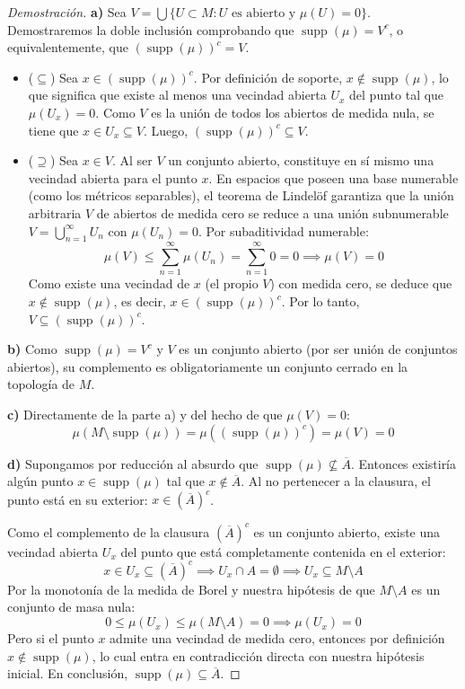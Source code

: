 \begin{proof}[Demostración]
	\textbf{a)} Sea $V = \bigcup \{ U \subset M : U \text{ es abierto y } \mu(U) = 0 \}$. Demostraremos la doble inclusión comprobando que $\operatorname{supp}(\mu) = V^c$, o equivalentemente, que $(\operatorname{supp}(\mu))^c = V$.
	\begin{itemize}
		\item ($\subseteq$) Sea $x \in (\operatorname{supp}(\mu))^c$. Por definición de soporte, $x \notin \operatorname{supp}(\mu)$, lo que significa que existe al menos una vecindad abierta $U_x$ del punto tal que $\mu(U_x) = 0$. Como $V$ es la unión de todos los abiertos de medida nula, se tiene que $x \in U_x \subseteq V$. Luego, $(\operatorname{supp}(\mu))^c \subseteq V$.
		\item ($\supseteq$) Sea $x \in V$. Al ser $V$ un conjunto abierto, constituye en sí mismo una vecindad abierta para el punto $x$. En espacios que poseen una base numerable (como los métricos separables), el teorema de Lindelöf garantiza que la unión arbitraria $V$ de abiertos de medida cero se reduce a una unión subnumerable $V = \bigcup_{n=1}^\infty U_n$ con $\mu(U_n) = 0$. Por subaditividad numerable:
		$$ \mu(V) \le \sum_{n=1}^\infty \mu(U_n) = \sum_{n=1}^\infty 0 = 0 \implies \mu(V) = 0 $$
		Como existe una vecindad de $x$ (el propio $V$) con medida cero, se deduce que $x \notin \operatorname{supp}(\mu)$, es decir, $x \in (\operatorname{supp}(\mu))^c$. Por lo tanto, $V \subseteq (\operatorname{supp}(\mu))^c$.
	\end{itemize}
	
	\textbf{b)} Como $\operatorname{supp}(\mu) = V^c$ y $V$ es un conjunto abierto (por ser unión de conjuntos abiertos), su complemento es obligatoriamente un conjunto cerrado en la topología de $M$.
	
	\textbf{c)} Directamente de la parte a) y del hecho de que $\mu(V) = 0$:
	$$ \mu(M \setminus \operatorname{supp}(\mu)) = \mu((\operatorname{supp}(\mu))^c) = \mu(V) = 0 $$
	
	\textbf{d)} Supongamos por reducción al absurdo que $\operatorname{supp}(\mu) \not\subseteq \overline{A}$. Entonces existiría algún punto $x \in \operatorname{supp}(\mu)$ tal que $x \notin \overline{A}$. Al no pertenecer a la clausura, el punto está en su exterior: $x \in (\overline{A})^c$.
	
	Como el complemento de la clausura $(\overline{A})^c$ es un conjunto abierto, existe una vecindad abierta $U_x$ del punto que está completamente contenida en el exterior:
	$$ x \in U_x \subseteq (\overline{A})^c \implies U_x \cap A = \emptyset \implies U_x \subseteq M \setminus A $$
	Por la monotonía de la medida de Borel y nuestra hipótesis de que $M \setminus A$ es un conjunto de masa nula:
	$$ 0 \le \mu(U_x) \le \mu(M \setminus A) = 0 \implies \mu(U_x) = 0 $$
	Pero si el punto $x$ admite una vecindad de medida cero, entonces por definición $x \notin \operatorname{supp}(\mu)$, lo cual entra en contradicción directa con nuestra hipótesis inicial. En conclusión, $\operatorname{supp}(\mu) \subseteq \overline{A}$.
\end{proof}

